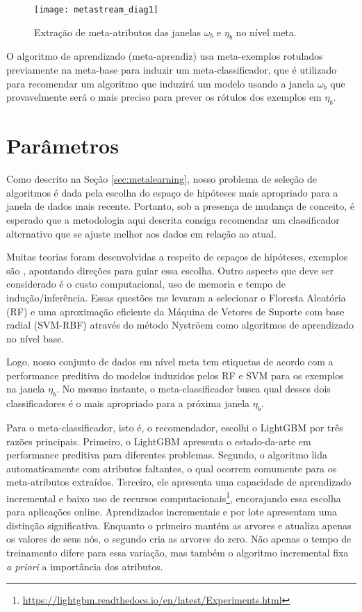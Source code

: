 \begin{figure}[ht]
    \centering
    \texttt{[image: metastream\_diag1]}
    \caption{Extração de meta-atributos das janelas  $\omega_b$ e $\eta_b$ no nível meta.}
    \label{fig:ms_diagram1}
\end{figure}

O algoritmo de aprendizado (meta-aprendiz) usa meta-exemplos rotulados
previamente na meta-base para induzir um meta-classificador, que é utilizado
para recomendar um algoritmo que induzirá um modelo usando a janela $\omega_b$
que provavelmente será o mais preciso para prever os rótulos dos exemplos em
$\eta_b$.

\section{Parâmetros}
\label{sec:params}

Como descrito na Seção \ref{sec:metalearning}, nosso problema de seleção de algoritmos é dada pela escolha do espaço de hipóteses mais apropriado para a janela de dados mais recente. Portanto, sob a presença de mudança de conceito, é esperado que a metodologia aqui descrita consiga recomendar um classificador alternativo que se ajuste melhor aos dados em relação ao atual.

Muitas teorias foram desenvolvidas a respeito de espaços de hipóteses, exemplos são \cite{vapnik2013nature, valiant1984theory}, apontando direções para guiar essa escolha. Outro aspecto que deve ser considerado é o custo computacional, uso de memoria e tempo de indução/inferência. Essas questões me levaram a selecionar o Floresta Aleatória (RF) \cite{Breiman2001} e uma aproximação eficiente da Máquina de Vetores de Suporte com base radial (SVM-RBF) através do método Nystr\"oem \cite{williams2001using} como algoritmos de aprendizado no nível base.

Logo, nosso conjunto de dados em nível meta tem etiquetas de acordo com a performance preditiva do modelos induzidos pelos RF e SVM para os exemplos na janela $\eta_b$. No mesmo instante, o meta-classificador busca qual desses dois classificadores é o mais apropriado para a próxima janela $\eta_b$.

Para o meta-classificador, isto é, o recomendador, escolhi o LightGBM por três razões principais. Primeiro, o LightGBM apresenta o estado-da-arte em performance preditiva para diferentes problemas\cite{ke2017lightgbm}. Segundo, o algoritmo lida automaticamente com atributos faltantes, o qual ocorrem comumente para os meta-atributos extraídos. Terceiro, ele apresenta uma capacidade de aprendizado incremental e baixo uso de recursos computacionais\footnote{\url{https://lightgbm.readthedocs.io/en/latest/Experiments.html}}, encorajando essa escolha para aplicações online. Aprendizados incrementais e por lote apresentam uma distinção significativa. Enquanto o primeiro mantém as arvores e atualiza apenas os valores de seus nós, o segundo cria as arvores do zero. Não apenas o tempo de treinamento difere para essa variação, mas também o algoritmo incremental fixa \textit{a priori} a importância dos atributos.

